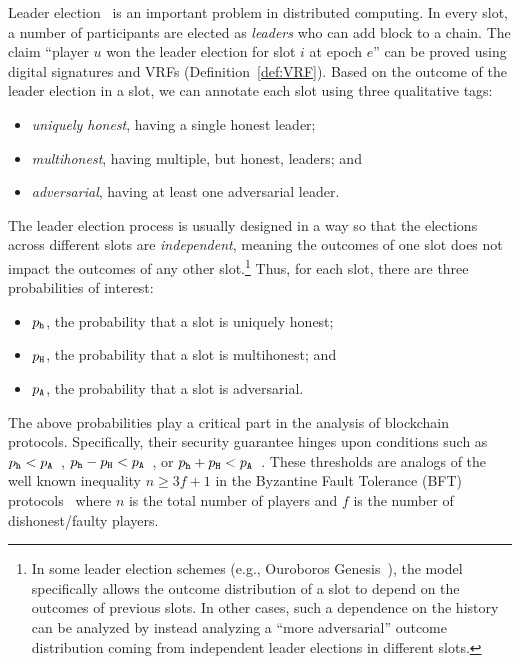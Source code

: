 \label{sec:leader-election-probs}
Leader election~\cite{RussellZuckerman} is an important problem in distributed computing.
In every slot, 
a number of participants are elected as \emph{leaders} who can add block to a chain. 
The claim ``player $u$ won the leader election for slot $i$ at epoch $e$'' 
can be proved using digital signatures and VRFs (Definition~\ref{def:VRF}).
Based on the outcome of the leader election in a slot, 
we can annotate each slot using three qualitative tags: 
\begin{itemize}
\item \emph{uniquely honest}, having a single honest leader;
\item \emph{multihonest}, having multiple, but honest,
  leaders; and
\item \emph{adversarial}, having at least one adversarial leader.
\end{itemize}
The leader election process is usually designed in a way so that 
the elections across different slots are \emph{independent}, 
meaning the outcomes of one slot does not impact the outcomes of any other slot.\footnote{
  In some leader election schemes (e.g., Ouroboros Genesis~\cite{Genesis}), 
  the model specifically allows 
  the outcome distribution of a slot to depend on the outcomes of previous slots. 
  In other cases, 
  such a dependence on the history can be analyzed 
  by instead analyzing a ``more adversarial'' outcome distribution 
  coming from independent leader elections in different slots. 
}
Thus, for each slot, there are three probabilities of interest:
\begin{itemize}
\item $p_{\mathtt{h}}$, the probability that a slot is uniquely honest;
\item $p_{\mathtt{H}}$, the probability that a slot is multihonest; and
\item $p_{\mathtt{A}}$, the probability that a slot is adversarial.
\end{itemize}

The above probabilities play a critical part 
in the analysis of blockchain protocols. 
Specifically, 
their security guarantee hinges upon conditions such as 
$p_{\mathtt{h}} < p_{\mathtt{A}}$~\cite{SnowWhite}, 
$p_{\mathtt{h}} - p_{\mathtt{H}} < p_{\mathtt{A}}$~\cite{Ouroboros,Praos,Genesis}, 
or $p_{\mathtt{h}} + p_{\mathtt{H}} < p_{\mathtt{A}}$~\cite{Nakamoto2008,GKL,PSS}.
These thresholds are analogs of the well known inequality 
$n \geq 3f + 1$ in the Byzantine Fault Tolerance (BFT) protocols~\cite{BFT} 
where $n$ is the total number of players and $f$ is the number of dishonest/faulty players.


